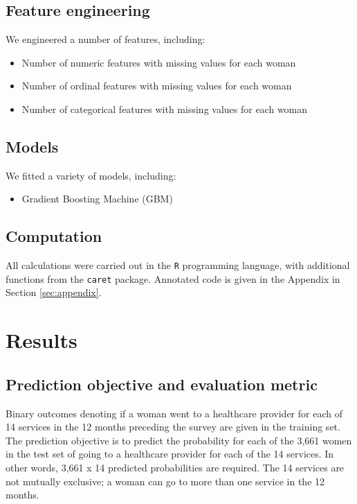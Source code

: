 \documentclass{article}\usepackage[]{graphicx}\usepackage[]{color}
\begin{document}
\subsection{Feature engineering}
We engineered a number of features, including:
\begin{itemize}
  \item Number of numeric features with missing values for each woman
  \item Number of ordinal features with missing values for each woman
  \item Number of categorical features with missing values for each woman
\end{itemize}

\subsection{Models}
We fitted a variety of models, including:
\begin{itemize}
  \item Gradient Boosting Machine (GBM)
\end{itemize}

\subsection{Computation}
All calculations were carried out in the \texttt{R} programming language, with additional functions from the \texttt{caret} package. Annotated code is given in the Appendix in Section \ref{sec:appendix}.
\section{Results} 
\label{sec:results}

\subsection{Prediction objective and evaluation metric}
Binary outcomes denoting if a woman went to a healthcare provider for each of 14 services in the 12 months preceding the survey are given in the training set. The prediction objective is to predict the probability for each of the 3,661 women in the test set of going to a healthcare provider for each of the 14 services. In other words, 3,661 x 14 predicted probabilities are required. The 14 services are not mutually exclusive; a woman can go to more than one service in the 12 months.
\end{document}
